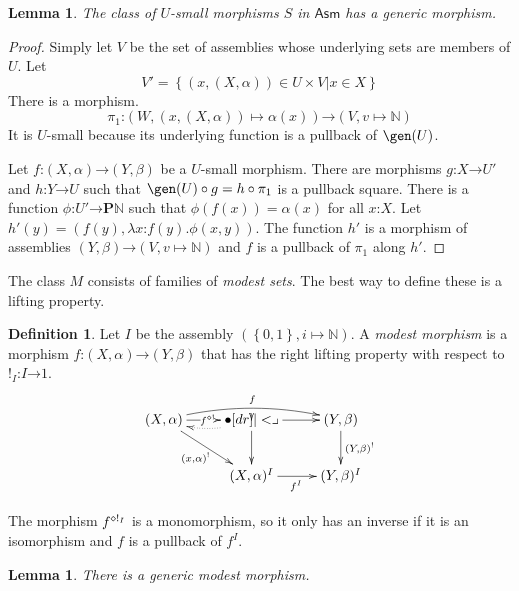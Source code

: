 \documentclass{amsart}
\theoremstyle{plain}
\newtheorem{lemma}[theorem]{Lemma}
\theoremstyle{definition}
\newtheorem{defin}[theorem]{Definition}
\newcommand\set[1]{\left\{#1\right\}}
\newcommand\N{\mathbb N}
\newcommand\pow{\mathbf P}
\newcommand\Asm{\mathsf{Asm}}
\newcommand\bang{!}
\newcommand\of{\mathord:}
\renewcommand\to{\mathord\rightarrow}
\begin{document}
\begin{lemma} The class of $U$-small morphisms $S$ in $\Asm$ has a generic morphism. \end{lemma}

\begin{proof}
Simply let $V$ be the set of assemblies whose underlying sets are members of $U$.
Let 
\[ V'=\set{(x,(X,\alpha)) \in U\times V| x\in X} \]
There is a morphism. 
\[\pi_1\of(W,(x,(X,\alpha))\mapsto \alpha(x))\to(V,v\mapsto\N) \]
It is $U$-small because its underlying function is a pullback of $\gen(U)$. 

Let $f\of (X,\alpha)\to (Y,\beta)$ be a $U$-small morphism. There are morphisms $g\of X\to U'$ and $h\of Y\to U$ such that $\gen(U)\circ g = h\circ \pi_1$ is a pullback square. There is a function $\phi\of U'\to\pow\N$ such that $\phi(f(x))=\alpha(x)$ for all $x\of X$. Let $h'(y) = (f(y),\lambda x\of f(y).\phi(x,y))$. The function $h'$ is a morphism of assemblies $(Y,\beta)\to (V,v\mapsto\N)$ and $f$ is a pullback of $\pi_1$ along $h'$.
\end{proof}

The class $M$ consists of families of \emph{modest sets}. The best way to define these is a lifting property.

\begin{defin} Let $I$ be the assembly $(\set{0,1},i\mapsto\N)$. A \emph{modest morphism} is a morphism $f\of(X,\alpha)\to(Y,\beta)$ that has the right lifting property with respect to $\bang_I\of I\to 1$.
\[\xymatrix{
(X,\alpha) \ar@/^2ex/[rr]^f \ar[dr]_{(x,\alpha)^\bang}\ar[r]|{f\pe\bang} & \bullet\ar[r]\ar[d]\pb\ar@{.>}@/^/[l] & (Y,\beta) \ar[d]^{(Y,\beta)^\bang}\\
& (X,\alpha)^I \ar[r]_{f^I} & (Y,\beta)^I 
}\]
\end{defin}

The morphism $f\pe{\bang_I}$ is a monomorphism, so it only has an inverse if it is an isomorphism and $f$ is a pullback of $f^I$.

\begin{lemma} There is a generic modest morphism. \end{lemma}
\end{document}
